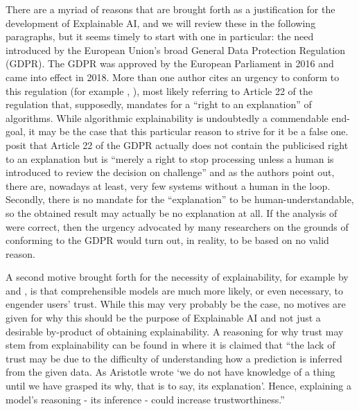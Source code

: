 There are a myriad of reasons that are brought forth as a justification for the development of Explainable AI, and we will review these in the following paragraphs, but it seems timely to start with one in particular: the need introduced by the European Union's broad General Data Protection Regulation (GDPR).
The GDPR was approved by the European Parliament in 2016 and came into effect in 2018.
More than one author cites an urgency to conform to this regulation (for example \citet{doshi2017towards}, \citet{gilpin2018explaining}), most likely referring to Article 22 of the regulation that, supposedly, mandates for a \enquote{right to an explanation} of algorithms.
While algorithmic explainability is undoubtedly a commendable end-goal, it may be the case that this particular reason to strive for it be a false one.
\citet{edwards2018enslaving} posit that Article 22 of the GDPR actually does not contain the publicised right to an explanation but is \enquote{merely a right to stop processing unless a human is introduced to review the decision on challenge} and as the authors point out, there are, nowadays at least, very few systems without a human in the loop.
Secondly, there is no mandate for the \enquote{explanation} to be human-understandable, so the obtained result may actually be no explanation at all.
If the analysis of \citet{edwards2018enslaving} were correct, then the urgency advocated by many researchers on the grounds of conforming to the GDPR would turn out, in reality, to be based on no valid reason.

A second motive brought forth for the necessity of explainability, for example by \citet{gilpin2018explaining} and \citet{abdul2018trends}, is that comprehensible models are much more likely, or even necessary, to engender users' trust.
While this may very probably be the case, no motives are given for why this should be the purpose of Explainable AI and not just a desirable by-product of obtaining explainability. 
A reasoning for why trust may stem from explainability can be found in \citep{Kyrimi2016} where it is claimed that \enquote{the lack of trust may be due to the difficulty of understanding how a prediction is inferred from the given data. As Aristotle wrote `we do not have knowledge of a thing until we have grasped its why, that is to say, its explanation'. Hence, explaining a model's reasoning - its inference - could increase trustworthiness.} 

